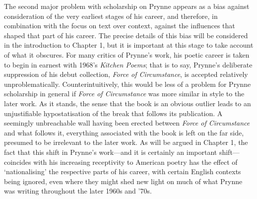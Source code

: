 \documentclass[]{article}
\begin{document}
The second major problem with scholarship on Prynne appears as a bias
against consideration of the very earliest stages of his career, and
therefore, in combination with the focus on text over context, against
the influences that shaped that part of his career. The precise details
of this bias will be considered in the introduction to Chapter 1, but it
is important at this stage to take account of what it obscures. For many
critics of Prynne’s work, his poetic career is taken to begin in earnest
with 1968’s \emph{Kitchen Poems}; that is to say, Prynne’s deliberate
suppression of his debut collection, \emph{Force of Circumstance}, is
accepted relatively unproblematically. Counterintuitively, this would be
less of a problem for Prynne scholarship in general if \emph{Force of
Circumstance} was more similar in style to the later work. As it stands,
the sense that the book is an obvious outlier leads to an unjustifiable
hypostatisation of the break that follows its publication. A seemingly
unbreachable wall having been erected between \emph{Force of
Circumstance} and what follows it, everything associated with the book
is left on the far side, presumed to be irrelevant to the later work. As
will be argued in Chapter 1, the fact that this shift in Prynne’s
work—and it is certainly an important shift—coincides with his
increasing receptivity to American poetry has the effect of
‘nationalising’ the respective parts of his career, with certain English
contexts being ignored, even where they might shed new light on much of
what Prynne was writing throughout the later 1960s and ’70s.
\end{document}
